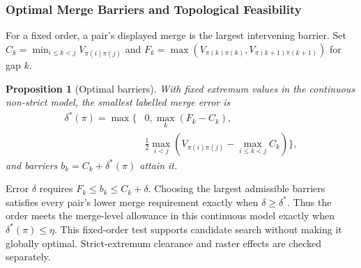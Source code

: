 \documentclass[review]{vgtc}
\newtheorem{proposition}{Proposition}
\begin{document}
\subsubsection{Optimal Merge Barriers and Topological Feasibility}
For a fixed order, a pair's displayed merge is the largest intervening barrier. Set $C_k=\min_{i\le k<j}V_{\pi(i)\pi(j)}$ and $F_k=\max(V_{\pi(k)\pi(k)},V_{\pi(k+1)\pi(k+1)})$ for gap $k$.
\begin{proposition}[Optimal barriers]\label{prop:barriers}
With fixed extremum values in the continuous non-strict model, the smallest labelled merge error is
\begin{equation}\label{eq:delta}
\begin{split}
 \delta^*(\pi)=\max\bigg\{&0,\max_k(F_k-C_k),\\
 &\frac12\max_{i<j}\left(V_{\pi(i)\pi(j)}-
                         \max_{i\le k<j}C_k\right)\bigg\},
\end{split}
\end{equation}
and barriers $b_k=C_k+\delta^*(\pi)$ attain it.
\end{proposition}
Error $\delta$ requires $F_k\le b_k\le C_k+\delta$. Choosing the largest admissible barriers satisfies every pair's lower merge requirement exactly when $\delta\ge\delta^*$. Thus the order meets the merge-level allowance in this continuous model exactly when $\delta^*(\pi)\le\eta$. This fixed-order test supports candidate search without making it globally optimal. Strict-extremum clearance and raster effects are checked separately.
\end{document}
